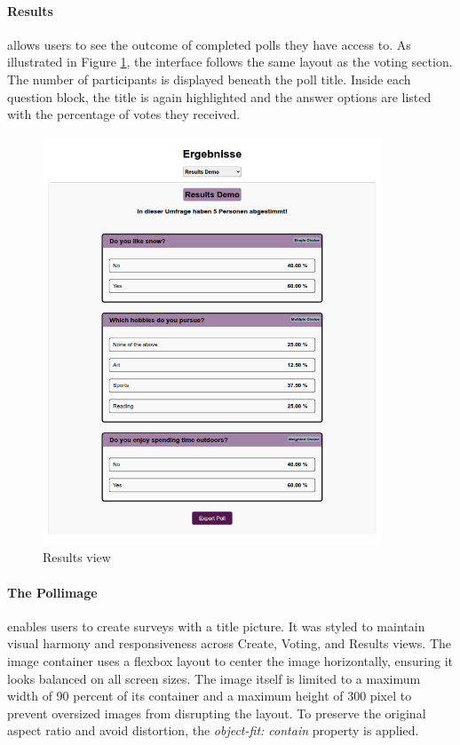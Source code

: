 \documentclass[a4paper,12pt]{report}
\begin{document}
\paragraph{Results} allows users to see the outcome of completed polls they have access to. As illustrated in Figure \ref{fig:results_view}, the interface follows the same layout as the voting section. The number of participants is displayed beneath the poll title. Inside each question block, the title is again highlighted and the answer options are listed with the percentage of votes they received.
\begin{figure}[H]
	\centering
	\includegraphics[width=0.9\textwidth]{pics/results_view.png}
	\caption{Results view}
	\label{fig:results_view}
\end{figure}
\paragraph{The Pollimage} enables users to create surveys with a title picture. It was styled to maintain visual harmony and responsiveness across Create, Voting, and Results views. The image container uses a flexbox layout to center the image horizontally, ensuring it looks balanced on all screen sizes. The image itself is limited to a maximum width of 90 percent of its container and a maximum height of 300 pixel to prevent oversized images from disrupting the layout. To preserve the original aspect ratio and avoid distortion, the \textit{object-fit: contain} property is applied. \parencite{cssobjectfit} \\ \\
\end{document}
